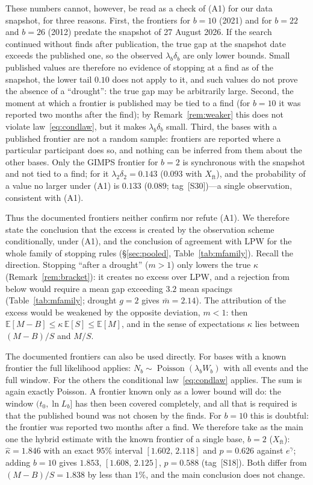 \documentclass[11pt,a4paper]{article}
\theoremstyle{plain}
\theoremstyle{remark}
\newcommand{\eg}{e^{\gamma}}
\DeclareMathOperator{\Pois}{Poisson}
\begin{document}
These numbers cannot, however, be read as a check of (A1) for our data snapshot,
for three reasons. First, the frontiers for $b=10$ (2021) and for $b=22$ and
$b=26$ (2012) predate the snapshot of 27 August 2026. If the search continued
without finds after publication, the true gap at the snapshot date exceeds the
published one, so the observed $\lambda_b\delta_b$ are only lower bounds. Small
published values are therefore no evidence of stopping at a find as of the
snapshot, the lower tail $0.10$ does not apply to it, and such values do not prove
the absence of a ``drought'': the true
gap may be arbitrarily large. Second, the moment at which a frontier is published
may be tied to a find (for $b=10$ it was reported two months after the find); by
Remark~\ref{rem:weaker} this does not violate law~\eqref{eq:condlaw}, but it makes
$\lambda_b\delta_b$ small. Third, the bases with a published frontier are not a
random sample: frontiers are reported where a particular participant does so, and
nothing can be inferred from them about the other bases. Only the GIMPS frontier
for $b=2$ is synchronous with the snapshot and not tied to a find; for it
$\lambda_2\delta_2=0.143$ ($0.093$ with $X_{\mathrm{ft}}$), and the probability of
a value no larger under (A1) is $0.133$ ($0.089$; tag~[S30])---a single
observation, consistent with (A1).

Thus the documented frontiers neither confirm nor refute (A1). We therefore state
the conclusion that the excess is created by the observation scheme conditionally,
under (A1), and the conclusion of agreement with LPW for the whole family of
stopping rules (\S\ref{sec:pooled}, Table~\ref{tab:mfamily}). Recall the
direction. Stopping ``after a drought'' ($m>1$) only lowers the true $\kappa$
(Remark~\ref{rem:bracket}): it creates no excess over LPW, and a rejection from
below would require a mean gap exceeding $3.2$ mean spacings
(Table~\ref{tab:mfamily}; drought $g=2$ gives $\bar m=2.14$). The attribution
of the excess would be weakened by the opposite deviation, $m<1$: then
$\mathbb E[M-B]\le\kappa\,\mathbb E[S]\le\mathbb E[M]$, and in the sense of
expectations $\kappa$ lies between $(M-B)/S$ and $M/S$.

The documented frontiers can also be used directly. For bases with a known
frontier the full likelihood applies: $N_b\sim\Pois(\lambda_bW_b)$ with all
events and the full window. For the others the conditional
law~\eqref{eq:condlaw} applies. The sum is again exactly Poisson. A frontier
known only as a lower bound will do: the window $(t_0,\ln L_b]$ has then been
covered completely, and all that is required is that the published bound was not
chosen by the finds. For $b=10$ this is doubtful: the frontier was reported two
months after a find. We therefore take as the main one the hybrid estimate with
the known frontier of a single base, $b=2$ ($X_{\mathrm{ft}}$): $\hat\kappa=1.846$
with an exact $95\%$ interval $[1.602,\,2.118]$ and $p=0.626$ against $\eg$; adding
$b=10$ gives $1.853$, $[1.608,\,2.125]$, $p=0.588$ (tag~[S18]). Both differ from
$(M-B)/S=1.838$ by less than $1\%$, and the main conclusion does not change.
\end{document}
